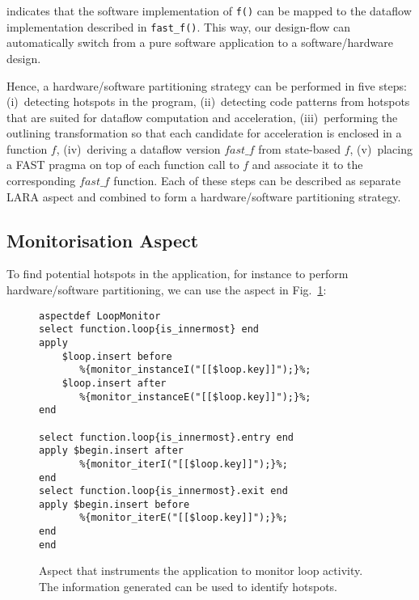 \noindent indicates that the software implementation of \texttt{f()} can be
mapped to the dataflow implementation described in \texttt{fast\_f()}. This
way, our design-flow can automatically switch from a pure software
application to a software/hardware design.

Hence, a hardware/software partitioning strategy can be performed in five steps: (i)~detecting hotspots in the program, (ii)~detecting code patterns from hotspots that are suited for dataflow computation and acceleration,
(iii)~performing the outlining transformation so that each candidate
for acceleration is enclosed in a function $f$, (iv)~deriving a
dataflow version $fast\_f$ from state-based $f$, (v)~placing a FAST pragma on top of each function call to $f$ and associate it to the corresponding $fast\_f$ function. Each of these steps can be described as separate LARA aspect and combined to form a hardware/software partitioning strategy.

\subsection{Monitorisation Aspect}
\label{sect:asp_mon}
To find potential hotspots in the application, for instance to perform hardware/software partitioning, we can use the aspect in Fig.~\ref{fig:hotspot}:

\lstset{style=lara}
\begin{figure}[!h]
\begin{lstlisting}
aspectdef LoopMonitor
select function.loop{is_innermost} end
apply
    $loop.insert before
       %{monitor_instanceI("[[$loop.key]]");}%;
    $loop.insert after
       %{monitor_instanceE("[[$loop.key]]");}%;
end

select function.loop{is_innermost}.entry end
apply $begin.insert after
       %{monitor_iterI("[[$loop.key]]");}%;
end
select function.loop{is_innermost}.exit end
apply $begin.insert before
       %{monitor_iterE("[[$loop.key]]");}%;
end
end
\end{lstlisting}
\caption{Aspect that instruments the application to monitor loop activity. The information generated can be used to identify hotspots.}
\label{fig:hotspot}
\end{figure}

